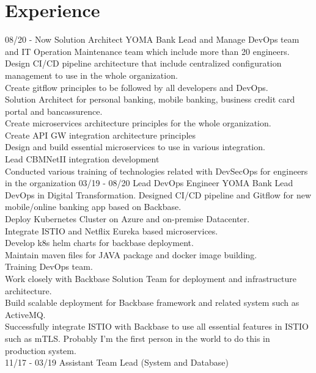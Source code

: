 \documentclass[]{friggeri-cv}
\begin{document}
\section{Experience}
\begin{entrylist}
  \entry
	{08/20 - Now}
	{Solution Architect}
	{YOMA Bank}
	{Lead and Manage DevOps team and IT Operation Maintenance team which include more than 20 engineers.\\Design CI/CD pipeline architecture that include centralized configuration management to use in the whole organization.\\Create gitflow principles to be followed by all developers and DevOps.\\Solution Architect for personal banking, mobile banking, business credit card portal and bancassurence.\\Create microservices architecture principles for the whole organization.\\Create API GW integration architecture principles\\Design and build essential microservices to use in various integration.\\Lead CBMNetII integration development\\Conducted various training of technologies related with DevSecOps for engineers in the organization}
  \entry
    {03/19 - 08/20}
    {Lead DevOps Engineer}
    {YOMA Bank}
    {Lead DevOps in Digital Transformation. Designed CI/CD pipeline and Gitflow for new mobile/online banking app based on Backbase.\\Deploy Kubernetes Cluster on Azure and on-premise Datacenter.\\Integrate ISTIO and Netflix Eureka based microservices.\\Develop k8s helm charts for backbase deployment.\\Maintain maven files for JAVA package and docker image building.\\Training DevOps team.\\Work closely with Backbase Solution Team for deployment and infrastructure architecture.\\Build scalable deployment for Backbase framework and related system such as ActiveMQ.\\Successfully integrate ISTIO with Backbase to use all essential features in ISTIO such as mTLS. Probably I'm the first person in the world to do this in production system.\\}
  \entry
    {11/17 - 03/19}
    {Assistant Team Lead (System and Database)}

\end{entrylist}
\end{document}
